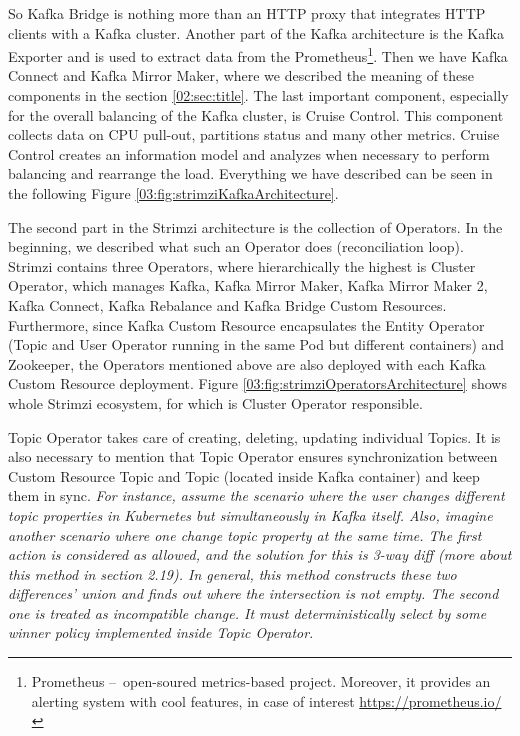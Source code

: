 So Kafka Bridge is nothing more than an HTTP proxy that integrates HTTP clients with a Kafka cluster. Another part of the Kafka architecture is the Kafka Exporter and is used to extract data from the Prometheus\footnote{Prometheus \---\ open-soured metrics-based project. Moreover, it provides an alerting system with cool features, in case of interest \url{https://prometheus.io/}}. Then we have Kafka Connect and Kafka Mirror Maker, where we described the meaning of these components in the section \ref{02:sec:title}. The last important component, especially for the overall balancing of the Kafka cluster, is Cruise Control. This component collects data on CPU pull-out, partitions status and many other metrics. Cruise Control creates an information model and analyzes when necessary to perform balancing and rearrange the load. Everything we have described can be seen in the following Figure \ref{03:fig:strimziKafkaArchitecture}.

The second part in the Strimzi architecture is the collection of Operators. In the beginning, we described what such an Operator does (reconciliation loop). Strimzi contains three Operators, where hierarchically the highest is Cluster Operator, which manages Kafka, Kafka Mirror Maker, Kafka Mirror Maker 2, Kafka Connect, Kafka Rebalance and Kafka Bridge Custom Resources. Furthermore, since Kafka Custom Resource encapsulates the Entity Operator (Topic and User Operator running in the same Pod but different containers) and Zookeeper, the Operators mentioned above are also deployed with each Kafka Custom Resource deployment. Figure \ref{03:fig:strimziOperatorsArchitecture} shows whole Strimzi ecosystem, for which is Cluster Operator responsible.

Topic Operator takes care of creating, deleting, updating individual Topics. It is also necessary to mention that Topic Operator ensures synchronization between Custom Resource Topic and Topic (located inside Kafka container) and keep them in sync. \emph{For
instance, assume the scenario where the user changes different topic properties in Kubernetes
but simultaneously in Kafka itself. Also, imagine another scenario where one change topic property at the same time. The first action is considered as allowed, and the solution for this is 3-way diff (more about this method in section 2.19). In general, this method constructs these two differences' union and finds out where the intersection is not empty. The second one is treated as incompatible change. It must deterministically select by some winner policy implemented inside Topic Operator}.

